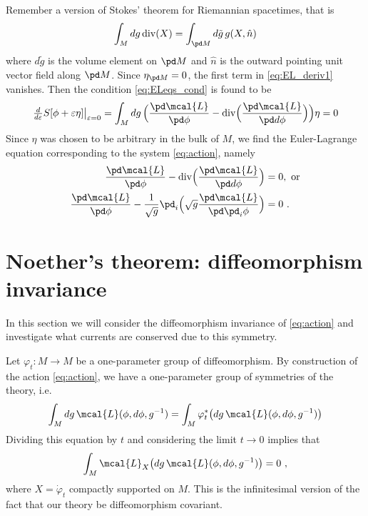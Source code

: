 \documentclass[11pt]{article}
\begin{document}
Remember a version of Stokes' theorem for Riemannian spacetimes, 
that is
%
\begin{equation}
	\int_M dg\, \mathrm{div}(X) = \int_{\pd M} d\tilde{g}\, 
	g(X,\hat{n})
\end{equation}
where $d\tilde{g}$ is the volume element on $\pd M$ and $\hat{n}$ 
is the outward pointing unit vector field along $\pd M$. Since 
$\eta_{\pd M} = 0$, the first term  in 
\eqref{eq:EL_deriv1} vanishes. Then the condition 
\eqref{eq:ELeqs_cond} is found to be
%
\begin{displaymath}
	\left.\tfrac{d}{d\varepsilon}S[\phi + 
	\varepsilon\eta]\right|_{\varepsilon=0}
	= \int_M dg\, \Big( \frac{\pd \mcal{L}}{\pd \phi} - 
	\mathrm{div}\Big( \frac{\pd\mcal{L}}{\pd d\phi}\Big)\Big) \eta 
	= 0
\end{displaymath}
Since $\eta$ was chosen to be arbitrary in the bulk of $M$, we 
find the Euler-Lagrange equation corresponding to the system 
\eqref{eq:action}, namely
%
\begin{subequations}
	\begin{align}
		\label{eq:ELeqs}
		\frac{\pd \mcal{L}}{\pd \phi} - \mathrm{div}\Big( 
		\frac{\pd\mcal{L}}{\pd d\phi}\Big) &= 0,~\text{or} \\
		\label{eq:ELeqs_bis}
		\frac{\pd \mcal{L}}{\pd \phi} - \frac{1}{\sqrt{g}} 
		\pd_i\Big(\sqrt{g} \frac{\pd\mcal{L}}{\pd \pd_i\phi}\Big) 
		&= 0~.
	\end{align}
\end{subequations}


\section{Noether's theorem: diffeomorphism invariance}

In this section we will consider the diffeomorphism invariance of 
\eqref{eq:action} and investigate what currents are conserved due 
to this symmetry.

Let $\varphi_t : M \to M$ be a one-parameter group of 
diffeomorphism. By construction of the action \eqref{eq:action}, 
we have a one-parameter group of symmetries of the theory, i.e.~
%
\begin{displaymath}
	\int_M dg\, \mcal{L}(\phi,d\phi,g^{-1}) = \int_M 
	\varphi^\ast_t\big(dg\, \mcal{L}(\phi,d\phi,g^{-1})\big)
\end{displaymath}
Dividing this equation by $t$ and considering the limit $t\to 0$ 
implies that
%
\begin{equation}\label{eq:diff_symm_action}
	\int_M \mcal{L}_X \big( dg\, \mcal{L}(\phi,d\phi,g^{-1})\big) 
	= 0~,
\end{equation}
where $X = \dot{\varphi}_t$ compactly supported on $M$. This is 
the infinitesimal version of the fact that our theory be 
diffeomorphism covariant.
\end{document}
